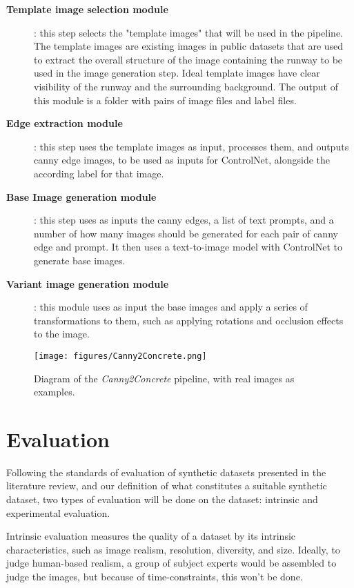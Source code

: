 \begin{description}
    \item[\textbf{Template image selection module}]: this step selects the "template images" that will be used in the pipeline. The template images are existing images in public datasets that are used to extract the overall structure of the image containing the runway to be used in the image generation step. Ideal template images have clear visibility of the runway and the surrounding background.  The output of this module is a folder with pairs of image files and label files.

    \item[\textbf{Edge extraction module}]: this step uses the template images as input, processes them, and outputs canny edge images, to be used as inputs for ControlNet, alongside the according label for that image.

    \item[\textbf{Base Image generation module}]: this step uses as inputs the canny edges, a list of text prompts, and a number of how many images should be generated for each pair of canny edge and prompt. It then uses a text-to-image model with ControlNet to generate base images.

    \item[\textbf{Variant image generation module}]: this module uses as input
      the base images and apply a series of transformations to them, such as
      applying rotations and occlusion effects to the image.
\end{description}

\begin{figure}[htbp]
\centering
\texttt{[image: figures/Canny2Concrete.png]}
  \caption{Diagram of the \emph{Canny2Concrete} pipeline, with real images as
  examples.}
\end{figure}

\FloatBarrier
\section{Evaluation}

Following the standards of evaluation of synthetic datasets presented in the literature review, and our definition of what constitutes a suitable synthetic dataset, two types of evaluation will be done on the dataset: intrinsic and experimental evaluation.

Intrinsic evaluation measures the quality of a dataset by its intrinsic characteristics, such as image realism, resolution, diversity, and size. Ideally, to judge human-based realism, a group of subject experts would be assembled to judge the images, but because of time-constraints, this won't be done.

